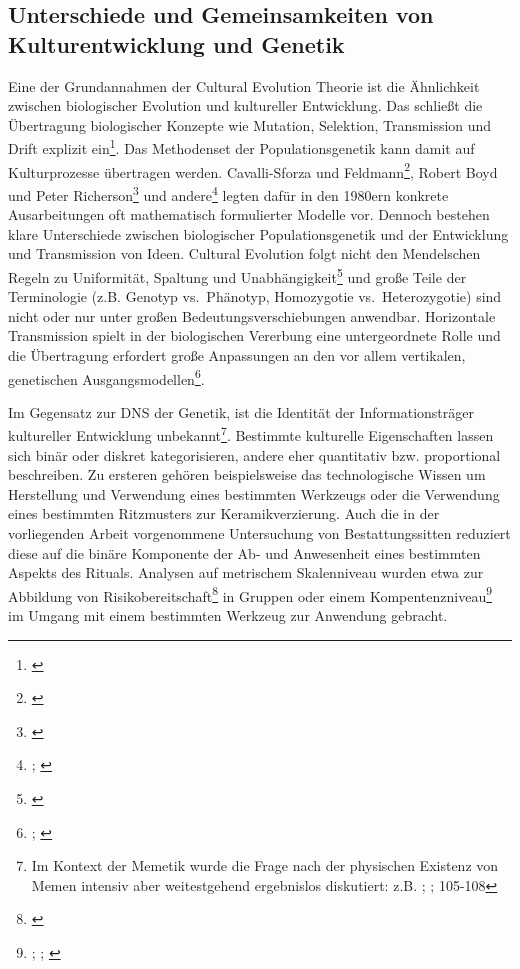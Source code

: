 \documentclass[openany,twoside,twocolumn]{book}
\let\rmarkdownfootnote\footnote%
\def\footnote{\protect\rmarkdownfootnote}
\begin{document}
\hypertarget{unterschiede-und-gemeinsamkeiten-von-kulturentwicklung-und-genetik}{%
\subsection{Unterschiede und Gemeinsamkeiten von Kulturentwicklung und
Genetik}\label{unterschiede-und-gemeinsamkeiten-von-kulturentwicklung-und-genetik}}

Eine der Grundannahmen der Cultural Evolution Theorie ist die
Ähnlichkeit zwischen biologischer Evolution und kultureller Entwicklung.
Das schließt die Übertragung biologischer Konzepte wie Mutation,
Selektion, Transmission und Drift explizit ein\footnote{\textcite{smith_cultural_1992}}.
Das Methodenset der Populationsgenetik kann damit auf Kulturprozesse
übertragen werden. Cavalli-Sforza und Feldmann\footnote{\textcite{cavalli-sforza_cultural_1981}},
Robert Boyd und Peter Richerson\footnote{\textcite{boyd_culture_1985}}
und andere\footnote{\textcite{lumsden_genes_1981};
  \textcite{pulliam_programmed_1980}} legten dafür in den 1980ern
konkrete Ausarbeitungen oft mathematisch formulierter Modelle vor.
Dennoch bestehen klare Unterschiede zwischen biologischer
Populationsgenetik und der Entwicklung und Transmission von Ideen.
Cultural Evolution folgt nicht den Mendelschen Regeln zu Uniformität,
Spaltung und Unabhängigkeit\footnote{\textcite{mesoudi_pursuing_2017}}
und große Teile der Terminologie (z.B. Genotyp vs.~Phänotyp, Homozygotie
vs.~Heterozygotie) sind nicht oder nur unter großen
Bedeutungsverschiebungen anwendbar. Horizontale Transmission spielt in
der biologischen Vererbung eine untergeordnete Rolle und die Übertragung
erfordert große Anpassungen an den vor allem vertikalen, genetischen
Ausgangsmodellen\footnote{\textcite{cavalli-sforza_cultural_1973};
  \textcite{feldman_cultural_1976}}.

Im Gegensatz zur DNS der Genetik, ist die Identität der
Informationsträger kultureller Entwicklung unbekannt\footnote{Im Kontext
  der Memetik wurde die Frage nach der physischen Existenz von Memen
  intensiv aber weitestgehend ergebnislos diskutiert: z.B.
  \textcite{delius_nature_1991}; \textcite{wilkinson_memes_1999};
  \textcite{blackmore_macht_2000} 105-108}. Bestimmte kulturelle
Eigenschaften lassen sich binär oder diskret kategorisieren, andere eher
quantitativ bzw. proportional beschreiben. Zu ersteren gehören
beispielsweise das technologische Wissen um Herstellung und Verwendung
eines bestimmten Werkzeugs oder die Verwendung eines bestimmten
Ritzmusters zur Keramikverzierung. Auch die in der vorliegenden Arbeit
vorgenommene Untersuchung von Bestattungssitten reduziert diese auf die
binäre Komponente der Ab- und Anwesenheit eines bestimmten Aspekts des
Rituals. Analysen auf metrischem Skalenniveau wurden etwa zur Abbildung
von Risikobereitschaft\footnote{\textcite{bisin_economics_2001-1}} in
Gruppen oder einem Kompentenzniveau\footnote{\textcite{baldini_revisiting_2015};
  \textcite{henrich_demography_2004};
  \textcite{kobayashi_innovativeness_2012}} im Umgang mit einem
bestimmten Werkzeug zur Anwendung gebracht.
\end{document}
